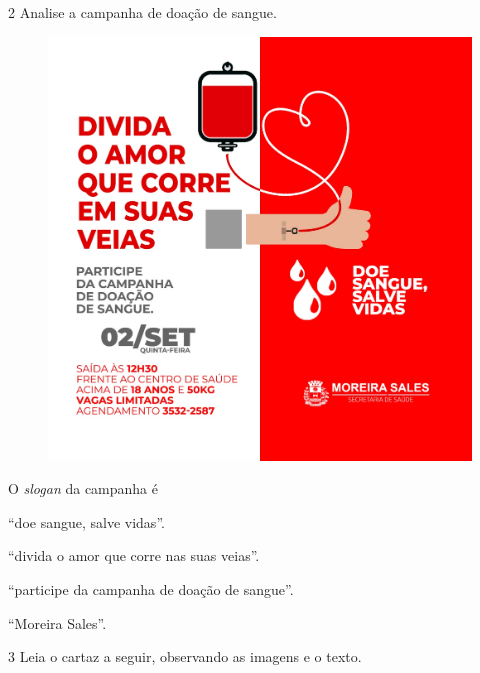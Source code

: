 \begin{conteudo}
\begin{conteudo}
\begin{conteudo}
\begin{conteudo}
\pagebreak
\num{2} Analise a campanha de doação de sangue.

\begin{figure}[htpb!]
\centering
\includegraphics[width=\textwidth]{media/image18.jpeg}
\end{figure}

O \emph{slogan} da campanha é

\begin{escolha}
\item ``doe sangue, salve vidas''.

\item ``divida o amor que corre nas suas veias''.

\item ``participe da campanha de doação de sangue''.

\item ``Moreira Sales''.
\end{escolha}

\pagebreak
\num{3} Leia o cartaz a seguir, observando as imagens e o texto. 


\end{conteudo}
\end{conteudo}
\end{conteudo}
\end{conteudo}
